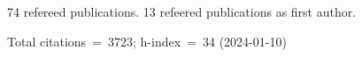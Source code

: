 74 refereed publications. 13 refeered publications as first author.

Total citations~=~3723; h-index~=~34 (2024-01-10)